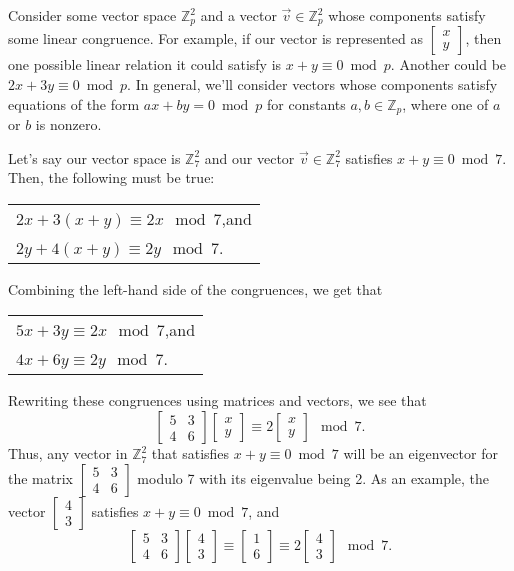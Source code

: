 \documentclass[a4paper, 12pt, reqno]{amsart}
\newcommand{\Z}{\mathbb{Z}}
\newcommand\smallmat[1]{\left[\begin{smallmatrix}#1\end{smallmatrix}\right]}
\begin{document}
	Consider some vector space $\Z_p^2$ and a vector $\vec{v} \in \Z_p^2$ whose components satisfy some linear congruence. For example, if our vector is represented as 
	$\smallmat{x\\y}$, then one possible linear relation it could satisfy is $x + y \equiv 0 \bmod{p}$. Another could be $2x + 3y \equiv 0 \bmod{p}$. In general, we'll 
	consider vectors whose components satisfy equations of the form $ax + by = 0 \bmod{p}$ for constants $a, b \in \Z_p$, where one of $a$ or $b$ is nonzero.
	
	Let's say our vector space is $\Z_7^2$ and our vector $\vec{v} \in \Z_7^2$ satisfies $x + y \equiv 0 \bmod{7}$. Then, the following must be true:
	\begin{center}
		\begin{tabular}{l}
			$2x + 3(x + y) \equiv 2x \mod{7}$,\quad and \\
			$2y + 4(x + y) \equiv 2y \mod{7}$.
		\end{tabular}
	\end{center}
	Combining the left-hand side of the congruences, we get that
	\begin{center}
		\begin{tabular}{l}
			$5x + 3y \equiv 2x \mod{7}$,\quad and \\
			$4x + 6y \equiv 2y \mod{7}$.
		\end{tabular}
	\end{center}
	Rewriting these congruences using matrices and vectors, we see that
	\[
		\begin{bmatrix}5 & 3 \\ 4 & 6\end{bmatrix}
		\begin{bmatrix}x \\ y\end{bmatrix}
		\equiv
		2\!\begin{bmatrix}x \\ y\end{bmatrix}
		\mod{7}.
	\]
	Thus, any vector in $\Z_7^2$ that satisfies $x + y \equiv 0 \bmod{7}$ will be an eigenvector for the matrix $\smallmat{5&3\\4&6}$ modulo 7 with its eigenvalue being 2. As
	an example, the vector $\smallmat{4\\3}$ satisfies $x + y \equiv 0 \bmod{7}$, and
	\[
		\begin{bmatrix}5 & 3 \\ 4 & 6\end{bmatrix}
		\begin{bmatrix}4 \\ 3\end{bmatrix}
		\equiv
		\begin{bmatrix}1 \\ 6\end{bmatrix}
		\equiv
		2\!\begin{bmatrix}4 \\ 3\end{bmatrix}
		\mod{7}.
	\]
	
\end{document}
